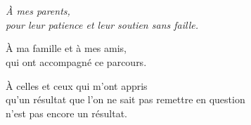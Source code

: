 %

\chapter*{}
\thispagestyle{empty}
\vspace*{\fill}

\begin{center}
\itshape
À mes parents,\\
pour leur patience et leur soutien sans faille.

\vspace{1.2em}

À ma famille et à mes amis,\\
qui ont accompagné ce parcours.

\vspace{1.2em}

À celles et ceux qui m'ont appris\\
qu'un résultat que l'on ne sait pas remettre en question\\
n'est pas encore un résultat.
\end{center}

\vspace*{\fill}
\cleardoublepage
